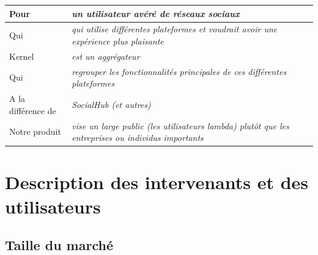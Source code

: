 \documentclass[11pt]{article}
\begin{document}

\begin{tabular}{|a|L{.75\linewidth}|}
	\hline
	Pour & \textit{un utilisateur avéré de réseaux sociaux} \\
	\hline
	Qui & \textit{qui utilise différentes plateformes et voudrait avoir une expérience plus plaisante} \\
	\hline
	Kernel & \textit{est un aggrégateur} \\
	\hline
	Qui & \textit{regrouper les fonctionnalités principales de ces différentes plateformes} \\
	\hline
	A la différence de & \textit{SocialHub (et autres)} \\
	\hline
	Notre produit & \textit{vise un large public (les utilisateurs lambda) plutôt que les entreprises ou individus importants} \\
	\hline
\end{tabular}




\newpage

\section{Description des intervenants et des utilisateurs}


\subsection{Taille du marché}
\end{document}
